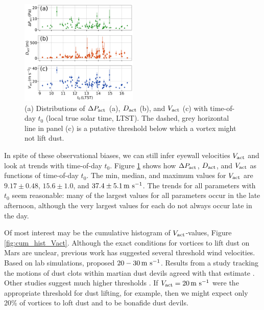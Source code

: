 \documentclass{aastex63}
\begin{document}
\begin{figure}
    \centering
    \includegraphics[width=0.5\textwidth]{figures/all_actual_values_vs_t0.png}
    \caption{(a) Distributions of $\Delta P_{\rm act}$ (a), $D_{\rm act}$ (b), and $V_{\rm act}$ (c) with time-of-day $t_0$ (local true solar time, LTST). The dashed, grey horizontal line in panel (c) is a putative threshold below which a vortex might not lift dust.}
    \label{fig:all_actual_values_vs_t0}
\end{figure}

In spite of these observational biases, we can still infer eyewall velocities $V_{\rm act}$ and look at trends with time-of-day $t_0$. Figure \ref{fig:all_actual_values_vs_t0} shows how $\Delta P_{\rm act}$, $D_{\rm act}$, and $V_{\rm act}$ as functions of time-of-day $t_0$. The min, median, and maximum values for $V_{\rm act}$ are $9.17\pm0.48$, $15.6\pm1.0$, and $37.4\pm5.1\,{\rm m\ s^{-1}}$. The trends for all parameters with $t_0$ seem reasonable: many of the largest values for all parameters occur in the late afternoon, although the very largest values for each do not always occur late in the day. 

Of most interest may be the cumulative histogram of $V_{\rm act}$-values, Figure \ref{fig:cum_hist_Vact}. Although the exact conditions for vortices to lift dust on Mars are unclear, previous work has suggested several threshold wind velocities. Based on lab simulations, \citet{2003JGRE..108.5041G} proposed $20-30\,{\rm m\ s^{-1}}$. Results from a study tracking the motions of dust clots within martian dust devils agreed with that estimate \citep{2011GeoRL..3824206C}. Other studies suggest much higher thresholds \citep[cf.][]{2006JGRE..11112002C}. If $V_{\rm act} = 20\,{\rm m\ s^{-1}}$ were the appropriate threshold for dust lifting, for example, then we might expect only 20\% of vortices to loft dust and to be bonafide dust devils. 
\end{document}
